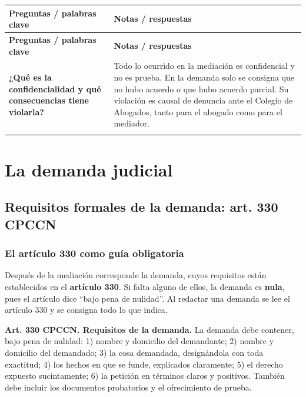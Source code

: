 \documentclass[12pt,oneside]{book}
\makeatletter
\newenvironment{cornell}{%
  \par\smallskip
  \begin{longtable}{@{}>{\raggedright\arraybackslash}p{0.28\textwidth}
                    >{\raggedright\arraybackslash}p{0.66\textwidth}@{}}
  \toprule
  \textbf{Preguntas / palabras clave} & \textbf{Notas / respuestas} \\
  \midrule
  \endfirsthead
  \toprule
  \textbf{Preguntas / palabras clave} & \textbf{Notas / respuestas} \\
  \midrule
  \endhead
}{%
  \bottomrule
  \end{longtable}
}
\newcommand{\cornellresumen}[1]{%
  \midrule
  \multicolumn{2}{@{}p{0.96\textwidth}@{}}{\textbf{Resumen:} #1} \\
}
\makeatother
\begin{document}
\begin{cornell}
\textbf{¿Qué es la confidencialidad y qué consecuencias tiene violarla?} &
Todo lo ocurrido en la mediación es confidencial y no es prueba. En la demanda solo se consigna que no hubo acuerdo o que hubo acuerdo parcial. Su violación es causal de denuncia ante el Colegio de Abogados, tanto para el abogado como para el mediador. \\
\cornellresumen{La mediación es la primera etapa del proceso: se notifica por carta documento, admite objeción dentro de los 5 días, se desarrolla con confidencialidad y se cierra con acuerdo homologado (total o parcial) o con habilitación de la vía judicial, dentro del plazo de 6 meses indicado en las notas, contando ante la duda el más corto.}
\end{cornell}

\chapter{La demanda judicial}

\section{Requisitos formales de la demanda: art. 330 CPCCN}

\subsection{El artículo 330 como guía obligatoria}

Después de la mediación corresponde la demanda, cuyos requisitos están establecidos en el \textbf{artículo 330}. Si falta alguno de ellos, la demanda es \textbf{nula}, pues el artículo dice ``bajo pena de nulidad''. Al redactar una demanda se lee el artículo 330 y se consigna todo lo que indica.

\begin{important}
\textbf{Art. 330 CPCCN. Requisitos de la demanda.} La demanda debe contener, bajo pena de nulidad: 1) nombre y domicilio del demandante; 2) nombre y domicilio del demandado; 3) la cosa demandada, designándola con toda exactitud; 4) los hechos en que se funde, explicados claramente; 5) el derecho expuesto sucintamente; 6) la petición en términos claros y positivos. También debe incluir los documentos probatorios y el ofrecimiento de prueba.
\end{important}
\end{document}
